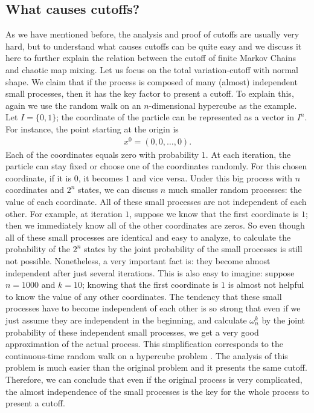 \subsection{What causes cutoffs?}
As we have mentioned before, the analysis and proof of cutoffs are usually very hard, but to understand what causes cutoffs can be quite easy and we discuss it here to further explain the relation between the cutoff of finite Markov Chains and chaotic map mixing. Let us focus on the total variation-cutoff with normal shape. We claim that if the process is composed of many (almost) independent small processes, then it has the key factor to present a cutoff. To explain this, again we use the random walk on an $n$-dimensional hypercube as the example. Let $I=\{0,1\}$; the coordinate of the particle can be represented as a vector in $I^n$. For instance, the point starting at the origin is
\begin{eqnarray*}
 x^0 = (0,0,\ldots,0).
\end{eqnarray*}
Each of the coordinates equals zero with probability $1$. At each iteration, the particle can stay fixed or choose one of the coordinates randomly. For this chosen coordinate, if it is $0$, it becomes $1$ and vice versa. Under this big process with $n$ coordinates and $2^n$ states, we can discuss $n$ much smaller random processes: the value of each coordinate. All of these small processes are not independent of each other. For example, at iteration $1$, suppose we know that the first coordinate is $1$; then we immediately know all of the other coordinates are zeros. 
So even though all of these small processes are identical and easy to analyze, to calculate the probability of the $2^n$ states by the joint probability of the small processes is still not possible. Nonetheless, a very important fact is: they become almost independent after just several iterations. This is also easy to imagine: suppose $n = 1000$ and $k = 10$; knowing that the first coordinate is $1$ is almost not helpful to know the value of any other coordinates. The tendency that these small processes have to become independent of each other is so strong that even if we just assume they are independent in the beginning, and calculate $\omega_n^k$ by the joint probability of these independent small processes, we get a very good approximation of the actual process. This simplification corresponds to the continuous-time random walk on a hypercube problem \cite{Diaconis1990}. The analysis of this problem is much easier than the original problem and it presents the same cutoff. Therefore, we can conclude that even if the original process is very complicated, the almost independence of the small processes is the key for the whole process to present a cutoff. 

